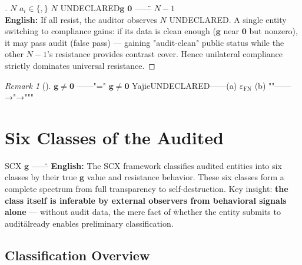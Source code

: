 \documentclass[12pt,a4paper]{article}
\theoremstyle{remark}
\newtheorem{remark}[theorem]{Remark}
\newcommand{\g}{\mathbf{g}}
\begin{document}
\begin{proof}[]
 $ N $  $ a_i \in \{\text{}, \text{}\} $ $ N $  UNDECLARED$ \g $  $ \mathbf{0} $ ——\"\" $ N-1 $ \\
\textbf{English:} If all resist, the auditor observes $ N $ UNDECLARED. A single entity switching to compliance gains: if its data is clean enough ($ \g $ near $ \mathbf{0} $ but nonzero), it may pass audit (false pass) — gaining "audit-clean" public status while the other $ N-1 $'s resistance provides contrast cover. Hence unilateral compliance strictly dominates universal resistance.
\end{proof}

\begin{remark}[]
 $ \g \neq \mathbf{0} $ ——"=" $ \g \neq \mathbf{0} $ \textbf{}Yajie\textbf{}UNDECLARED——(a)  $ \varepsilon_{\text{FN}} $ (b) ""——→"→"""
\end{remark}

\section{}
\section{Six Classes of the Audited}

\noindent
\textbf{} SCX $ \g $ \"\"\"\"\textbf{}——\"\"

\vspace{6pt}
\noindent
\textbf{English:} The SCX framework classifies audited entities into six classes by their true $ \g $ value and resistance behavior. These six classes form a complete spectrum from full transparency to self-destruction. Key insight: \textbf{the class itself is inferable by external observers from behavioral signals alone} — without audit data, the mere fact of \"whether the entity submits to audit\" already enables preliminary classification.

\subsection{}
\subsection{Classification Overview}
\end{document}
